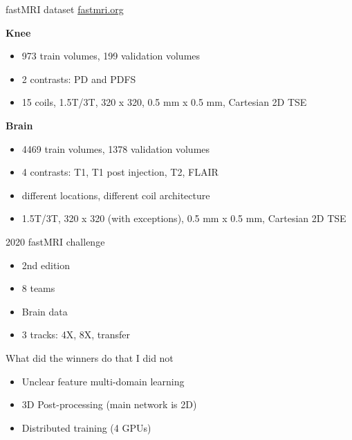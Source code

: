 \begin{frame}{fastMRI dataset}
    \href{https://fastmri.org/}{fastmri.org}
    \begin{multicols}{2}
        \textbf{Knee}
        \begin{itemize}
            \item 973 train volumes, 199 validation volumes
            \item 2 contrasts: PD and PDFS
            \item 15 coils, 1.5T/3T, 320 x 320, 0.5 mm x 0.5 mm, Cartesian 2D TSE
        \end{itemize}
        \newpage
        \textbf{Brain}
        \begin{itemize}
            \item 4469 train volumes, 1378 validation volumes
            \item 4 contrasts: T1, T1 post injection, T2, FLAIR
            \item different locations, different coil architecture
            \item 1.5T/3T, 320 x 320 (with exceptions), 0.5 mm x 0.5 mm, Cartesian 2D TSE
        \end{itemize}
    \end{multicols}
\end{frame}

\begin{frame}{2020 fastMRI challenge}
    \begin{itemize}
        \item 2nd edition
        \item 8 teams
        \item Brain data
        \item 3 tracks: 4X, 8X, transfer
    \end{itemize}
\end{frame}

\begin{frame}{What did the winners do that I did not}
    \begin{itemize}
        \item Unclear feature multi-domain learning
        \item 3D Post-processing (main network is 2D)
        \item Distributed training (4 GPUs)
    \end{itemize}
\end{frame}

